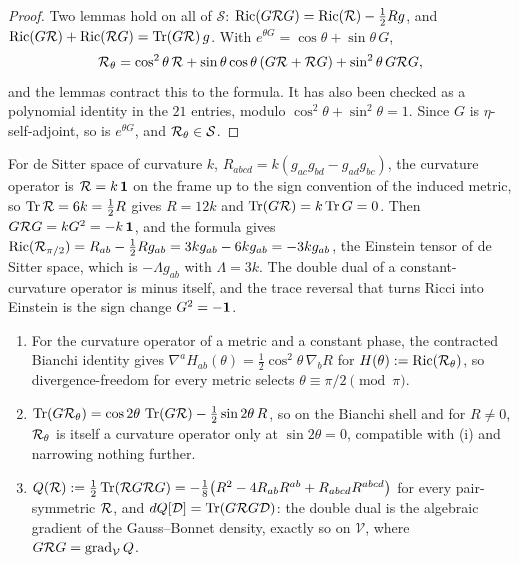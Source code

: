 \begin{proof}
Two lemmas hold on all of $\mathcal S$: $\operatorname{Ric}(G\mathcal R G)=\operatorname{Ric}(\mathcal R)-\tfrac12Rg$, and $\operatorname{Ric}(G\mathcal R)+\operatorname{Ric}(\mathcal R G)=\operatorname{Tr}(G\mathcal R)\,g$. With $e^{\theta G}=\cos\theta+\sin\theta\,G$,
\[
\mathcal R_\theta=\cos^2\theta\,\mathcal R+\sin\theta\cos\theta\,(G\mathcal R+\mathcal R G)+\sin^2\theta\,G\mathcal R G ,
\]
and the lemmas contract this to the formula. It has also been checked as a polynomial identity in the $21$ entries, modulo $\cos^2\theta+\sin^2\theta=1$. Since $G$ is
$\eta$-self-adjoint, so is $e^{\theta G}$, and $\mathcal R_\theta\in\mathcal S$.
\end{proof}

\begin{example}
\label{ex:dS}
For de Sitter space of curvature $k$, $R_{abcd}=k(g_{ac}g_{bd}-g_{ad}g_{bc})$, the curvature operator is $\mathcal R=k\,\mathbf 1$ on the frame up to the sign convention of the
induced metric, so $\operatorname{Tr}\mathcal R=6k=\tfrac12R$ gives $R=12k$ and $\operatorname{Tr}(G\mathcal R)=k\operatorname{Tr} G=0$. Then $G\mathcal R G=kG^2=-k\,\mathbf 1$, and the formula gives
$\operatorname{Ric}(\mathcal R_{\pi/2})=R_{ab}-\tfrac12Rg_{ab}=3kg_{ab}-6kg_{ab}=-3kg_{ab}$, the Einstein tensor of de Sitter space, which is $-\Lambda g_{ab}$ with $\Lambda=3k$. The double
dual of a constant-curvature operator is minus itself, and the trace reversal that turns Ricci into Einstein is the sign change $G^2=-\mathbf 1$.
\end{example}

\begin{corollary}
\label{cor:phasesel}
\begin{enumerate}[label=(\roman*),leftmargin=2.2em]
\item For the curvature operator of a metric and a constant phase, the contracted Bianchi identity gives $\nabla^aH_{ab}(\theta)=\tfrac12\cos^2\theta\,\nabla_bR$ for
$H(\theta):=\operatorname{Ric}(\mathcal R_\theta)$, so divergence-freedom for every metric selects $\theta\equiv\pi/2\pmod\pi$.
\item $\operatorname{Tr}(G\mathcal R_\theta)=\cos2\theta\,\operatorname{Tr}(G\mathcal R)-\tfrac12\sin2\theta\,R$, so on the Bianchi shell and for $R\neq0$, $\mathcal R_\theta$ is itself a curvature operator only at
$\sin2\theta=0$, compatible with (i) and narrowing nothing further.
\item $Q(\mathcal R):=\tfrac12\operatorname{Tr}(\mathcal R G\mathcal R G)=-\tfrac18\bigl(R^2-4R_{ab}R^{ab}+R_{abcd}R^{abcd}\bigr)$ for every pair-symmetric $\mathcal R$, and $dQ[\mathcal D]=\operatorname{Tr}(G\mathcal R G\mathcal D)$: the
double dual is the algebraic gradient of the Gauss--Bonnet density, exactly so on $\mathcal V$, where $G\mathcal R G=\operatorname{grad}_{\mathcal V}Q$.
\end{enumerate}
\end{corollary}

